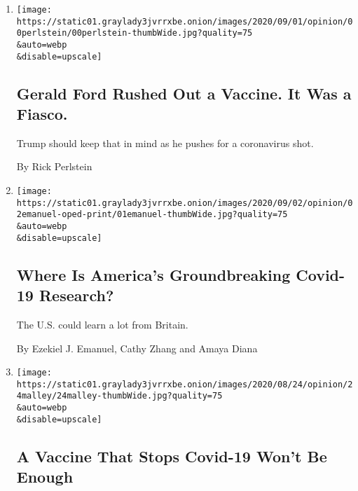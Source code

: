 \begin{enumerate}
\def\labelenumi{\arabic{enumi}.}
\item
  \href{/2020/09/02/opinion/coronavirus-vaccine-trump.html}{}

  \texttt{[image: https://static01.graylady3jvrrxbe.onion/images/2020/09/01/opinion/00perlstein/00perlstein-thumbWide.jpg?quality=75\\\&auto=webp\\\&disable=upscale]}

  \hypertarget{gerald-ford-rushed-out-a-vaccine-it-was-a-fiasco}{%
  \subsection{Gerald Ford Rushed Out a Vaccine. It Was a
  Fiasco.}\label{gerald-ford-rushed-out-a-vaccine-it-was-a-fiasco}}

  Trump should keep that in mind as he pushes for a coronavirus shot.

  By Rick Perlstein
\item
  \href{/2020/09/01/opinion/coronavirus-clinical-research.html}{}

  \texttt{[image: https://static01.graylady3jvrrxbe.onion/images/2020/09/02/opinion/02emanuel-oped-print/01emanuel-thumbWide.jpg?quality=75\\\&auto=webp\\\&disable=upscale]}

  \hypertarget{where-is-americas-groundbreaking-covid-19-research}{%
  \subsection{Where Is America's Groundbreaking Covid-19
  Research?}\label{where-is-americas-groundbreaking-covid-19-research}}

  The U.S. could learn a lot from Britain.

  By Ezekiel J. Emanuel, Cathy Zhang and Amaya Diana
\item
  \href{/2020/08/24/opinion/coronavirus-vaccine-prevention.html}{}

  \texttt{[image: https://static01.graylady3jvrrxbe.onion/images/2020/08/24/opinion/24malley/24malley-thumbWide.jpg?quality=75\\\&auto=webp\\\&disable=upscale]}

  \hypertarget{a-vaccine-that-stops-covid-19-wont-be-enough}{%
  \subsection{A Vaccine That Stops Covid-19 Won't Be
  Enough}\label{a-vaccine-that-stops-covid-19-wont-be-enough}}


\end{enumerate}

